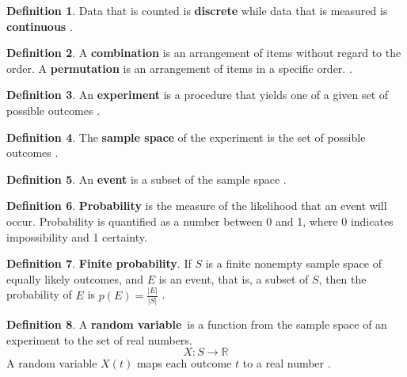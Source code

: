 \documentclass[12pt]{article}
\theoremstyle{plain}
\theoremstyle{definition}
\newtheorem{definition}{Definition}
\theoremstyle{remark}
\begin{document}
\begin{definition}
  Data that is counted is \textbf{discrete} while data that is measured is
  \textbf{continuous} \citep{matisfundis18}.
\end{definition}

\begin{definition}
  A \textbf{combination} is an arrangement of items without regard to the order.
  A \textbf{permutation} is an arrangement of items in a specific order.
  \citep{matisfuncom18}.
\end{definition}

\begin{definition}
  An \textbf{experiment} is a procedure that yields one of a given set of
  possible outcomes \citep{ros02}.
\end{definition}

\begin{definition}
  The \textbf{sample space} of the experiment is the set of possible outcomes
  \citep{ros02}.
\end{definition}

\begin{definition}
  An \textbf{event} is a subset of the sample space \citep{ros02}.
\end{definition}

\begin{definition}
  \textbf{Probability} is the measure of the likelihood that an event will
  occur.
  Probability is quantified as a number between 0 and 1, where 0 indicates
  impossibility and 1 certainty.
\end{definition}

\begin{definition}
  \textbf{Finite probability}. If $S$ is a finite nonempty sample space of
  equally likely outcomes, and $E$ is an event, that is, a subset of $S$,
  then the probability of $E$ is $p(E)=\frac{|E|}{|S|}$ \citep{ros02}.
\end{definition}

\begin{definition}
  A \textbf{random variable}\footnotemark\ is a function from the sample space
  of an experiment to the set of real numbers.
  \begin{equation*}
    X:S \to \mathbb{R}
  \end{equation*}
  A random variable $X(t)$ maps each outcome $t$ to a real number \citep{ros02}.
\end{definition}
\end{document}
